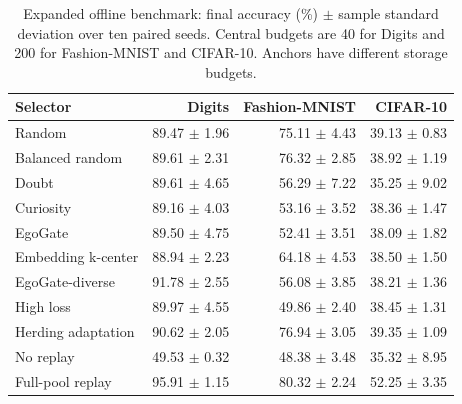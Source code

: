 \begin{table}[t]
\centering\small
\caption{Expanded offline benchmark: final accuracy (\%) $\pm$ sample standard deviation over ten paired seeds. Central budgets are 40 for Digits and 200 for Fashion-MNIST and CIFAR-10. Anchors have different storage budgets.}
\label{tab:offlineexpanded}
\begin{tabular}{lrrr}\toprule
Selector & Digits & Fashion-MNIST & CIFAR-10\\\midrule
Random & 89.47 $\pm$ 1.96 & 75.11 $\pm$ 4.43 & 39.13 $\pm$ 0.83 \\
Balanced random & 89.61 $\pm$ 2.31 & 76.32 $\pm$ 2.85 & 38.92 $\pm$ 1.19 \\
Doubt & 89.61 $\pm$ 4.65 & 56.29 $\pm$ 7.22 & 35.25 $\pm$ 9.02 \\
Curiosity & 89.16 $\pm$ 4.03 & 53.16 $\pm$ 3.52 & 38.36 $\pm$ 1.47 \\
EgoGate & 89.50 $\pm$ 4.75 & 52.41 $\pm$ 3.51 & 38.09 $\pm$ 1.82 \\
Embedding k-center & 88.94 $\pm$ 2.23 & 64.18 $\pm$ 4.53 & 38.50 $\pm$ 1.50 \\
EgoGate-diverse & 91.78 $\pm$ 2.55 & 56.08 $\pm$ 3.85 & 38.21 $\pm$ 1.36 \\
High loss & 89.97 $\pm$ 4.55 & 49.86 $\pm$ 2.40 & 38.45 $\pm$ 1.31 \\
Herding adaptation & 90.62 $\pm$ 2.05 & 76.94 $\pm$ 3.05 & 39.35 $\pm$ 1.09 \\
No replay & 49.53 $\pm$ 0.32 & 48.38 $\pm$ 3.48 & 35.32 $\pm$ 8.95 \\
Full-pool replay & 95.91 $\pm$ 1.15 & 80.32 $\pm$ 2.24 & 52.25 $\pm$ 3.35 \\
\bottomrule\end{tabular}
\end{table}
